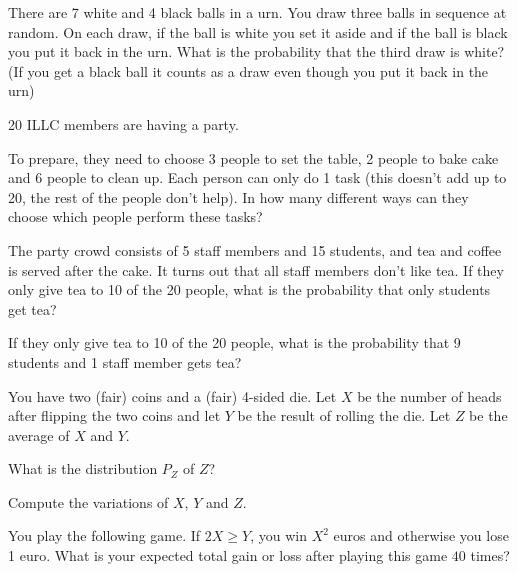 \documentclass[a4paper,10pt,landscape,twocolumn]{scrartcl}
\begin{document}
\begin{exercise}
There are 7 white and 4 black balls in a urn. You draw three balls in sequence at random. On each draw, if the ball is white you set it aside and if the ball is black you put it back in the urn. What is the probability that the third draw is white? (If you get a black ball it counts as a draw even though you put it back in the urn)


\begin{exercise}
 20 ILLC members are having a party.

\begin{subex}[(3pts)]
To prepare, they need to choose 3 people to set the table, 2 people to bake cake and 6 people to clean up. Each person can only do 1 task (this doesn't add up to 20, the rest of the people don't help). In how many different ways can they choose which people perform these tasks?
\end{subex}
\begin{subex}[(3pts)]
The party crowd consists of 5 staff members and 15 students, and tea and coffee is served after the cake. It turns out that all staff members don't like tea. If they only give tea to 10 of the 20 people, what is the probability that only students get tea?
\end{subex}
\begin{subex}[(3pts)]
If they only give tea to 10 of the 20 people, what is the probability that 9 students and 1 staff member gets tea?
\end{subex}
\end{exercise}

\begin{exercise}
  You have two (fair) coins and a (fair) 4-sided die. Let $X$ be the number of
  heads after flipping the two coins and let $Y$ be the result of rolling the
  die. Let $Z$ be the average of $X$ and $Y$.

\begin{subex}[(2pt)]
What is the distribution $P_Z$ of $Z$?
\end{subex}

  \begin{subex}[(3pt)]
    Compute the variations of $X$, $Y$ and $Z$.	
  \end{subex}
  
  \begin{subex}[(3pt)]
    You play the following game. If $2X \ge Y$, you win $X^2$ euros and
    otherwise you lose 1 euro. What is your expected total gain or loss after
    playing this game $40$ times?
  \end{subex}
\end{exercise}



\end{exercise}
\end{document}
